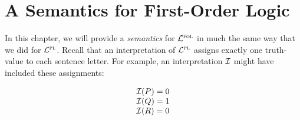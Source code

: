 ﻿%
\chapter{A Semantics for First-Order Logic}
\label{ch.FOL-semantics}




In this chapter, we will provide a \textit{semantics} for $\mathcal{L}^{\textsc{fol}}$ in much the same way that we did for $\mathcal{L}^{\textsc{pl}}$.
Recall that an interpretation of $\mathcal{L}^{\textsc{pl}}$ assigns exactly one truth-value to each sentence letter.
For example, an interpretation $\mathcal{I}$ might have included these assignments:

\begin{displaymath}
	\begin{array}{ll}
    \mathcal{I}(P) = 0\\
    \mathcal{I}(Q) = 1\\
    \mathcal{I}(R) = 0
	\end{array}
\end{displaymath}

